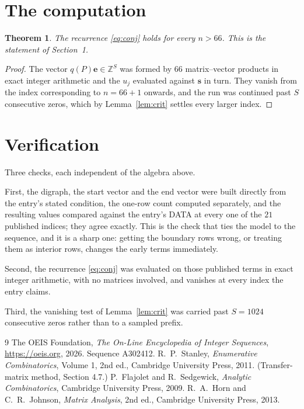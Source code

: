 \documentclass[11pt,a4paper]{article}
\theoremstyle{plain}
\newtheorem{theorem}{Theorem}
\theoremstyle{definition}
\begin{document}
\section{The computation}

\begin{theorem}
The recurrence \eqref{eq:conj} holds for every $n>66$. This is the statement of
Section~1.
\end{theorem}

\begin{proof}
The vector $q(P)\mathbf{e}\in\mathbb{Z}^{S}$ was formed by $66$ matrix--vector
products in exact integer arithmetic and the $u_j$ evaluated against $\mathbf{s}$ in turn.
They vanish from the index corresponding to $n=66+1$ onwards, and the run was continued
past $S$ consecutive zeros, which by Lemma~\ref{lem:crit} settles every larger index.
\end{proof}

\section{Verification}

Three checks, each independent of the algebra above.

First, the digraph, the start vector and the end vector were built directly from the
entry's stated condition, the one-row count computed separately, and the resulting values
compared against the entry's DATA at every one of the $21$ published indices; they
agree exactly. This is the check that ties the model to the sequence, and it is a sharp one:
getting the boundary rows wrong, or treating them as interior rows, changes the early terms
immediately.

Second, the recurrence \eqref{eq:conj} was evaluated on those published terms in exact
integer arithmetic, with no matrices involved, and vanishes at every index the entry claims.

Third, the vanishing test of Lemma~\ref{lem:crit} was carried past $S=1024$ consecutive
zeros rather than to a sampled prefix.

\begin{thebibliography}{9}
 The OEIS Foundation, \emph{The On-Line Encyclopedia of Integer
Sequences}, \url{https://oeis.org}, 2026. Sequence A302412.
 R.~P.~Stanley, \emph{Enumerative Combinatorics}, Volume 1, 2nd ed.,
Cambridge University Press, 2011. (Transfer-matrix method, Section 4.7.)
 P.~Flajolet and R.~Sedgewick, \emph{Analytic Combinatorics}, Cambridge
University Press, 2009.
 R.~A.~Horn and C.~R.~Johnson, \emph{Matrix Analysis}, 2nd ed., Cambridge
University Press, 2013.
\end{thebibliography}
\end{document}
